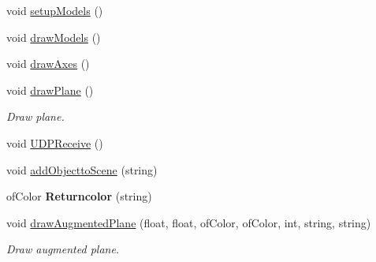 \begin{DoxyCompactItemize}
\item 
void \hyperlink{classtest_app_af88f7715b2e0a9692b4ec947fad63c31}{setup\-Models} ()
\item 
void \hyperlink{classtest_app_a78bdea262a12308cb6f9f9243bdb3db9}{draw\-Models} ()
\item 
void \hyperlink{classtest_app_aa2fcbae31171ba366d4c0fcaf44149f4}{draw\-Axes} ()
\item 
void \hyperlink{classtest_app_a47747729f6d0d84c36ef0ec9fca01303}{draw\-Plane} ()
\begin{DoxyCompactList}\small\item\em Draw plane. \end{DoxyCompactList}\item 
void \hyperlink{classtest_app_ae18e12d5025a2167ebd63ca019468cc0}{U\-D\-P\-Receive} ()
\item 
void \hyperlink{classtest_app_aa1d58aa9130d8d7526eb407f13f7a833}{add\-Objectto\-Scene} (string)
\item 
\hypertarget{classtest_app_a689f3b0cf0b38217152da7f5ce0d609f}{of\-Color {\bfseries Returncolor} (string)}\label{classtest_app_a689f3b0cf0b38217152da7f5ce0d609f}

\item 
void \hyperlink{classtest_app_a34646de458b0af33bc02457c9b8583df}{draw\-Augmented\-Plane} (float, float, of\-Color, of\-Color, int, string, string)
\begin{DoxyCompactList}\small\item\em Draw augmented plane. \end{DoxyCompactList}\end{DoxyCompactItemize}
